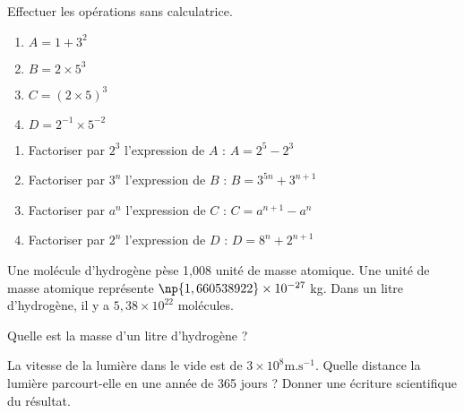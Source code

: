 \begin{minipage}{0.5\linewidth}



Effectuer les opérations sans calculatrice.

\begin{enumerate}
\item $A = 1 + 3^2$
\item $B = 2 \times 5^3$
\item $C = ( 2 \times 5)^3$
\item $D = 2^{-1} \times 5^{-2}$
\end{enumerate}
\end{minipage}
\begin{minipage}{0.5\linewidth}


\begin{enumerate}
\item Factoriser par $2^3$ l'expression de $A$ :  $A = 2^5-2^3$
\item Factoriser par $3^n$ l'expression de $B$ :  $B = 3^{5n} + 3^{n+1}$
\item Factoriser par $a^n$ l'expression de $C$ :  $C = a^{n+1}-a^n$
\item Factoriser par $2^n$ l'expression de $D$ :  $D = 8^n + 2^{n+1}$
\end{enumerate}
\end{minipage}


Une molécule d'hydrogène pèse 1,008 unité de masse atomique. Une unité de masse atomique représente $ \np{1,660538922} \times 10^{-27}$ kg. Dans un litre d'hydrogène, il y a $5,38 \times 10^{22}$ molécules.

Quelle est la masse d'un litre d'hydrogène ?





La vitesse de la lumière dans le vide est de $3\times 10^8 \text{m.s}^{-1}$. Quelle distance la lumière parcourt-elle en une année de 365 jours ? Donner une écriture scientifique du résultat.






